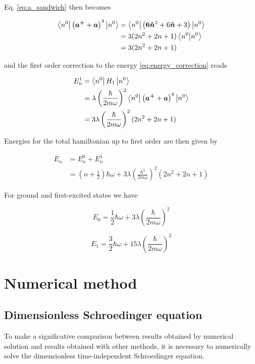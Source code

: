 \documentclass{article}
\begin{document}
Eq. \eqref{eq:a_sandwich} then becomes


\begin{align}
\bra{n^0} \left( \bm{a^+} + \bm{a} \right)^4 \ket{n^0} & = \bra{n^0} \left( \bm{ 6 \hat{n} }^2 + 6 \bm{ \hat{n} } + 3 \right) \ket{n^0} \nonumber \\
& = 3 (2n^2 + 2n +1) \braket{n^0}{n^0} \nonumber \\
& = 3(2n^2 + 2n +1)
\end{align}

and the first order correction to the energy \eqref{eq:energy_correction} reads

\begin{align}
\label{eq:x4correction}
E_n^1 & = \bra{n^0} H_1 \ket{n^0} \nonumber \\
& = \lambda \left( \frac{\hbar}{2m \omega} \right)^2 \bra{n^0} \left( \bm{a^+} + \bm{a} \right)^4 \ket{n^0} \nonumber \\
& = 3 \lambda \left( \frac{\hbar}{2m \omega} \right)^2 (2n^2 + 2n +1)
\end{align}

Energies for the total hamiltonian up to first order are then given by

\begin{align}
E_n & = E_n^0 + E_n^1 \nonumber \\
& = \left( n + \frac{1}{2} \right) \hbar \omega + 3 \lambda \left( \frac{\hbar^2}{2m\omega} \right)^2 (2n^2 + 2n +1)
\end{align}

For ground and first-excited states we have

\begin{equation}
E_0 = \frac{1}{2} \hbar \omega + 3 \lambda \left( \frac{\hbar}{2m\omega} \right)^2
\end{equation}

\begin{equation}
E_1 = \frac{3}{2} \hbar \omega + 15 \lambda \left( \frac{\hbar}{2m\omega} \right)^2
\end{equation}

\section{Numerical method}

\subsection{Dimensionless Schroedinger equation}
To make a significative comparison between results obtained by numerical solution and results obtained with other methods, it is necessary to numerically solve the dimensionless time-independent Schroedinger equation.
\end{document}
